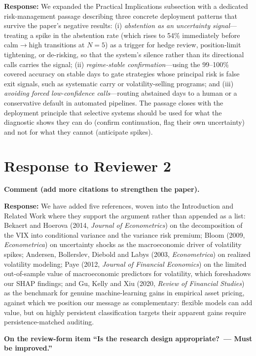 \documentclass[11pt]{article}
\newcommand{\response}{\textbf{Response:} }
\begin{document}
\response We expanded the Practical Implications subsection with a dedicated risk-management
passage describing three concrete deployment patterns that survive the paper's negative
results: (i) \emph{abstention as an uncertainty signal}---treating a spike in the abstention
rate (which rises to 54\% immediately before calm$\to$high transitions at $N = 5$) as a
trigger for hedge review, position-limit tightening, or de-risking, so that the system's
silence rather than its directional calls carries the signal; (ii) \emph{regime-stable
confirmation}---using the 99--100\% covered accuracy on stable days to gate strategies whose
principal risk is false exit signals, such as systematic carry or volatility-selling programs;
and (iii) \emph{avoiding forced low-confidence calls}---routing abstained days to a human or a
conservative default in automated pipelines. The passage closes with the deployment principle
that selective systems should be used for what the diagnostic shows they can do (confirm
continuation, flag their own uncertainty) and not for what they cannot (anticipate spikes).

\section*{Response to Reviewer 2}

\textbf{Comment (add more citations to strengthen the paper).}

\response We have added five references, woven into the Introduction and Related Work where
they support the argument rather than appended as a list: Bekaert and Hoerova (2014,
\emph{Journal of Econometrics}) on the decomposition of the VIX into conditional variance and
the variance risk premium; Bloom (2009, \emph{Econometrica}) on uncertainty shocks as the
macroeconomic driver of volatility spikes; Andersen, Bollerslev, Diebold and Labys (2003,
\emph{Econometrica}) on realized volatility modeling; Paye (2012, \emph{Journal of Financial
Economics}) on the limited out-of-sample value of macroeconomic predictors for volatility,
which foreshadows our SHAP findings; and Gu, Kelly and Xiu (2020, \emph{Review of Financial
Studies}) as the benchmark for genuine machine-learning gains in empirical asset pricing,
against which we position our message as complementary: flexible models can add value, but on
highly persistent classification targets their apparent gains require persistence-matched
auditing.

\textbf{On the review-form item ``Is the research design appropriate?\ --- Must be
improved.''}
\end{document}
